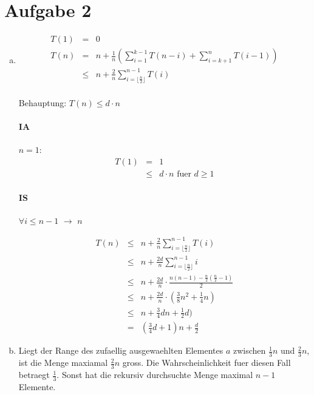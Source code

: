\section*{Aufgabe 2}
\begin{enumerate}[(a)]
\item 
    \begin{eqnarray}
    T(1) &=& 0 \\
    T(n) &=& n + \frac{1}{n} \left( \sum_{i=1}^{k-1} T(n-i) + \sum_{i=k+1}^{n} T(i-1) \right) \\
         &\leq& n + \frac{2}{n} \sum_{i=\lfloor \frac{n}{2} \rfloor}^{n-1} T(i) \\
    \end{eqnarray}

    Behauptung: $T(n) \leq d \cdot n$

    \paragraph{IA} $n=1$: 
    \begin{eqnarray}
        T(1) &=& 1 \\ &\leq& d \cdot n \text{ fuer $d\geq 1$}
    \end{eqnarray}

    \paragraph{IS} $\forall i\leq n-1$ $\to$ $n$

    \begin{eqnarray}
    T(n) 
         &\leq& n + \frac{2}{n} \sum_{i=\lfloor \frac{n}{2} \rfloor}^{n-1} T(i) \\
         &\leq& n + \frac{2d}{n} \sum_{i=\lfloor \frac{n}{2} \rfloor}^{n-1} i \\
         &\leq& n + \frac{2d}{n} \cdot \frac{n(n-1) - \frac{n}{2}(\frac{n}{2}-1)}{2}  \\
         &\leq& n + \frac{2d}{n} \cdot (\frac{3}{8}n^2 + \frac{1}{4} n) \\
         &\leq& n + \frac{3}{4} d n + \frac{1}{2} d) \\
         &=& \left( \frac{3}{4} d + 1 \right) n + \frac{d}{2}
    \end{eqnarray}

\item
    Liegt der Range des zufaellig ausgewaehlten Elementes $a$ zwischen $\frac{1}{3}n$ und $\frac{2}{3}n$,
    ist die Menge maxiamal $\frac{2}{3} n$ gross. Die Wahrscheinlichkeit fuer diesen Fall betraegt $\frac{1}{3}$.
    Sonst hat die rekursiv durchsuchte Menge maximal $n-1$ Elemente.


\end{enumerate}

